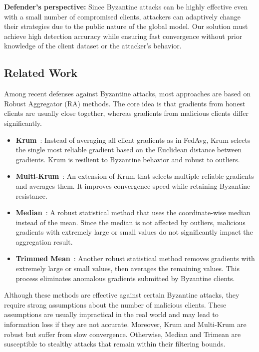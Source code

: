 \documentclass[journal]{IEEEtran}
\begin{document}
\noindent\textbf{Defender's perspective:} Since Byzantine attacks can be highly effective even with a small number of compromised clients, attackers can adaptively change their strategies due to the public nature of the global model. Our solution must achieve high detection accuracy while ensuring fast convergence without prior knowledge of the client dataset or the attacker's behavior.

\subsection{Related Work}

Among recent defenses against Byzantine attacks, most approaches are based on Robust Aggregator (RA) methods. The core idea is that gradients from honest clients are usually close together, whereas gradients from malicious clients differ significantly.

\begin{itemize}
    \item \textbf{Krum}~\cite{blanchard2017machine}: Instead of averaging all client gradients as in FedAvg, Krum selects the single most reliable gradient based on the Euclidean distance between gradients. Krum is resilient to Byzantine behavior and robust to outliers.

    \item \textbf{Multi-Krum}~\cite{blanchard2017machine}: An extension of Krum that selects multiple reliable gradients and averages them. It improves convergence speed while retaining Byzantine resistance.

    \item \textbf{Median}~\cite{yin2018byzantine}: A robust statistical method that uses the coordinate-wise median instead of the mean. Since the median is not affected by outliers, malicious gradients with extremely large or small values do not significantly impact the aggregation result.

    \item \textbf{Trimmed Mean}~\cite{yin2018byzantine}: Another robust statistical method removes gradients with extremely large or small values, then averages the remaining values. This process eliminates anomalous gradients submitted by Byzantine clients.
\end{itemize}

Although these methods are effective against certain Byzantine attacks, they require strong assumptions about the number of malicious clients. These assumptions are usually impractical in the real world and may lead to information loss if they are not accurate. Moreover, Krum and Multi-Krum are robust but suffer from slow convergence. Otherwise, Median and Trimean are susceptible to stealthy attacks that remain within their filtering bounds.
\end{document}
